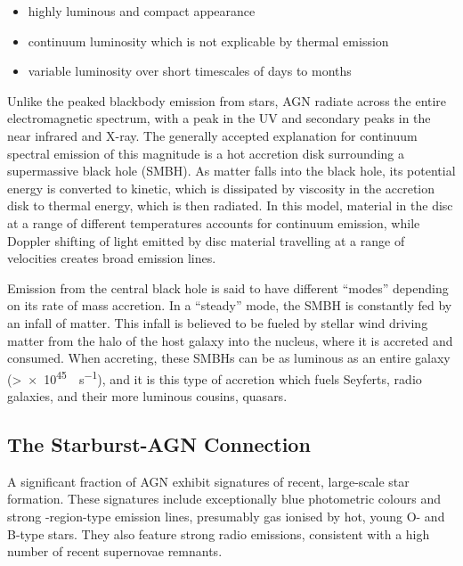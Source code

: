 \documentclass[a4paper,11pt]{article}
\begin{document}
\begin{itemize}
    \item highly luminous and compact appearance
    \item continuum luminosity which is not explicable by thermal emission
    \item variable luminosity over short timescales of days to months
\end{itemize}

Unlike the peaked blackbody emission from stars, AGN radiate across the entire electromagnetic spectrum, with a peak in the UV and secondary peaks in the near infrared and X-ray. The generally accepted explanation for continuum spectral emission of this magnitude is a hot accretion disk surrounding a supermassive black hole (SMBH).\cite{Sparke_2000} As matter falls into the black hole, its potential energy is converted to kinetic, which is dissipated by viscosity in the accretion disk to thermal energy, which is then radiated. In this model, material in the disc at a range of different temperatures accounts for continuum emission, while Doppler shifting of light emitted by disc material travelling at a range of velocities creates broad emission lines.\cite{Peterson_1997}

Emission from the central black hole is said to have different ``modes'' depending on its rate of mass accretion. In a ``steady'' mode, the SMBH is constantly fed by an infall of matter.\cite{Romero_Canizales_2016, Shields_1978} This infall is believed to be fueled by stellar wind driving matter from the halo of the host galaxy into the nucleus, where it is accreted and consumed. When accreting, these SMBHs can be as luminous as an entire galaxy (\textgreater\SI{e45}{\erg\per\second}), and it is this type of accretion which fuels Seyferts, radio galaxies, and their more luminous cousins, quasars.\cite{Kormendy_2013, Peterson_1997}

\subsection{The Starburst-AGN Connection}\label{sec:starburst_agn_connection}


A significant fraction of AGN exhibit signatures of recent, large-scale star formation. These signatures include exceptionally blue photometric colours and strong -region-type emission lines, presumably gas ionised by hot, young O- and B-type stars. They also feature strong radio emissions, consistent with a high number of recent supernovae remnants.\cite{Peterson_1997}
\end{document}
